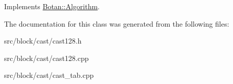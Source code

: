 Implements \hyperlink{classBotan_1_1Algorithm_a42d3ee39e051eba01ecace201fe1e6fd}{Botan\-::\-Algorithm}.



The documentation for this class was generated from the following files\-:\begin{DoxyCompactItemize}
\item 
src/block/cast/cast128.\-h\item 
src/block/cast/cast128.\-cpp\item 
src/block/cast/cast\-\_\-tab.\-cpp\end{DoxyCompactItemize}
